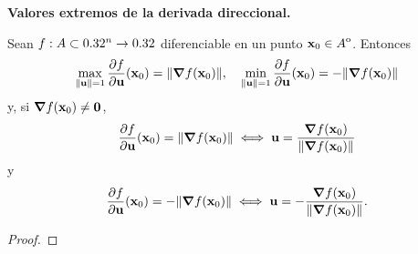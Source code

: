 \begin{theorem}\textbf{Valores extremos de la derivada direccional.} \label{teo:max_deriv}
\mbox{}

 Sean $f: A \subset 0.32^n \to 0.32$ diferenciable en un punto $\mathbf{x}_0 \in {\kern0ptA}^{\mathrm{o}}$. Entonces 
 \[
  \max_{\norm{{\mathbf{u}}} = 1} \frac{\partial f}{\partial {\mathbf{u}}} (\mathbf{x}_0) = \norm{\grad f (\mathbf{x}_0)}, \quad 
  \min_{\norm{{\mathbf{u}}} = 1} \frac{\partial f}{\partial {\mathbf{u}}} (\mathbf{x}_0) = -\norm{\grad f (\mathbf{x}_0)}
 \]
y, si $\grad f(\mathbf{x}_0) \ne \mathbf{0}$,
\[
 \frac{\partial f}{\partial {\mathbf{u}}} (\mathbf{x}_0) = \norm{\grad f (\mathbf{x}_0)} \iff {\mathbf{u}} = \frac{\grad f(\mathbf{x}_0)}{\norm{\grad f(\mathbf{x}_0)}}
\]
y
\[
 \frac{\partial f}{\partial {\mathbf{u}}} (\mathbf{x}_0) = -\norm{\grad f (\mathbf{x}_0)} \iff {\mathbf{u}} = -\frac{\grad f(\mathbf{x}_0)}{\norm{\grad f(\mathbf{x}_0)}}.
\]
\begin{proof}
\mbox{}


\end{proof}
\end{theorem}
